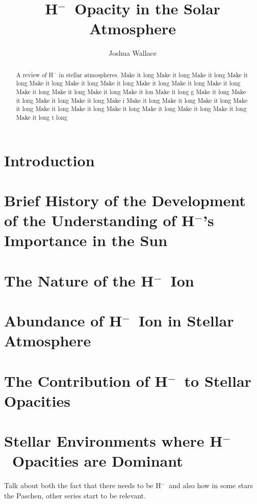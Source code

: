 \documentclass{emulateapj}
\def\h{H$^-$}
\begin{document}
\title{\h\ Opacity in the Solar Atmosphere}

\author{Joshua Wallace}


\begin{abstract}
A review of H$^-$ in stellar atmospheres. Make it long  Make it long  Make it long  Make it long  Make it long  Make it long  Make it long  Make it long  Make it long  Make it long  Make it long  Make it long  Make it long  Make it lon Make it long g  Make it long  Make it long  Make it long  Make it long  Make i Make it long  Make it long  Make it long  Make it long  Make it long  Make it long  Make it long  Make it long  Make it long  Make it long  Make it long t long 
\end{abstract}


\section{Introduction}


\section{Brief History of the Development of the Understanding of \h's Importance in the Sun}


\section{The Nature of the \h\ Ion}


\section{Abundance of \h\ Ion in Stellar Atmosphere}


\section{The Contribution of \h\ to Stellar Opacities}


\section{Stellar Environments where \h\ Opacities are Dominant}
Talk about both the fact that there needs to be \h\ and also how in
some stars the Paschen, other series start to be relevant.




\end{document}
